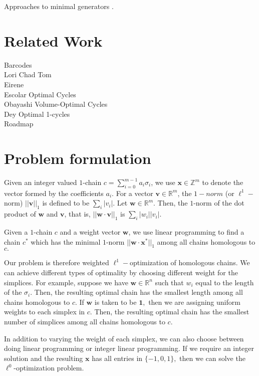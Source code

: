 \documentclass[11pt]{article}
\begin{document}
Approaches to minimal generators \cite{Escolar2016,Dey2019,Obayashi2018}. 


\section{Related Work}

Barcodes \cite{Ghrist08}\\
Lori Chad Tom \cite{TZH15}\\
Eirene \cite{henselman2016matroid}\\
Escolar Optimal Cycles \cite{Escolar2016}\\
Obayashi Volume-Optimal Cycles \cite{Obayashi2018}\\
Dey Optimal 1-cycles \cite{Dey2019}\\
Roadmap \cite{roadmap2017}\\

\section{Problem formulation}
% 
Given an integer valued $1$-chain $c = \sum_{i=0}^{m-1} a_i \sigma_i$, we use $\mathbf{x} \in \mathbb{Z}^m$ to denote the vector formed by the coefficients $a_i.$ 
For a vector $\mathbf{v} \in \mathbb{R}^m$, the $1-norm$ (or $\ell^1-$norm) $||\mathbf{v}||_1$ is defined to be $\sum_i|v_i|.$ Let $\mathbf{w} \in \mathbb{R}^m$. Then, the $1$-norm of the dot product of $\mathbf{w} $ and $\mathbf{v}$, that is, $||\mathbf{w}\cdot \mathbf{v}||_1$ is $\sum_i|w_i||v_i|.$ 

Given a $1$-chain $c$ and a weight vector $\mathbf{w}$, we use linear programming to find a chain $c^*$ which has the minimal $1$-norm $||\mathbf{w} \cdot  \mathbf{x^*}||_1$ among all chains homologous to $c.$

Our problem is therefore weighted $\ell^1-$optimization of homologous chains. We can achieve different types of optimality by choosing different weight for the simplices. For example, suppose we have $\mathbf{w} \in \mathbb{R}^n$ such that $w_i$ equal to the length of the $\sigma_i$. Then, the resulting optimal chain has the smallest length among all chains homologous to $c.$ If $\mathbf{w}$ is taken to be $\mathbf{1},$ then we are assigning uniform weights to each simplex in $c.$ Then, the resulting optimal chain has the smallest number of simplices among all chains homologous to $c.$

In addition to varying the weight of each simplex, we can also choose between doing linear programming or integer linear programming. If we require an integer solution and the resulting $\mathbf{x}$ has all entries in $\{-1,0,1\},$ then we can solve the $\ell^0$-optimization problem. 
\end{document}
